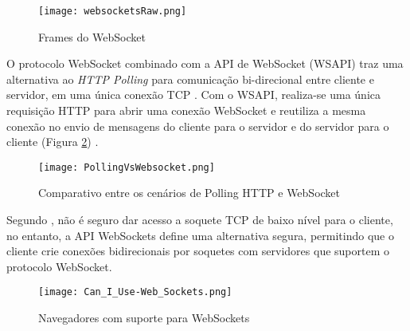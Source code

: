 \begin{figure}[!htb]
	\centering
	\caption{Frames do WebSocket}
	\texttt{[image: websocketsRaw.png]}
	\label{fig:websocketsRaw}
\end{figure}

O protocolo WebSocket combinado com a API de WebSocket (WSAPI) traz uma alternativa ao \emph{HTTP Polling} para comunicação bi-direcional entre cliente e servidor, em uma única conexão TCP \cite{Saint-Andre2011}. Com o WSAPI, realiza-se uma única requisição HTTP para abrir uma conexão WebSocket  e reutiliza a mesma conexão no envio de mensagens do cliente para o servidor e do servidor para o cliente (Figura \ref{fig:pollingVSwebsocket}) \cite{Wang2013}.

\begin{figure}[!htb]
	\centering
	\caption{Comparativo entre os cenários de Polling HTTP e WebSocket}
	\texttt{[image: PollingVsWebsocket.png]}
	\label{fig:pollingVSwebsocket}
\end{figure}

Segundo , não é seguro dar acesso a soquete TCP de baixo nível para o cliente, no entanto, a API WebSockets define uma alternativa segura, permitindo que o cliente crie conexões bidirecionais por soquetes com servidores que suportem o protocolo WebSocket.




\begin{figure}[!htb]
	\centering
	\caption{Navegadores com suporte para WebSockets}
	\texttt{[image: Can\_I\_Use-Web\_Sockets.png]}
	\label{fig:websocket}
\end{figure}
